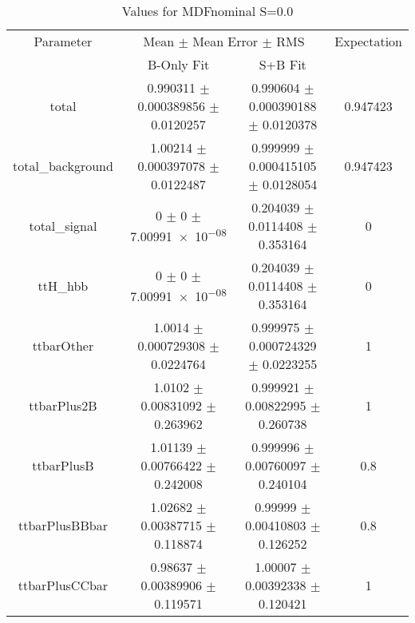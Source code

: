 \begin{table}
\centering
\caption{Values for MDFnominal S=0.0}
\begin{tabular}{cccc}
\toprule
Parameter & \multicolumn{2}{c}{Mean $\pm$ Mean Error $\pm$ RMS} & Expectation\\
 & B-Only Fit & S+B Fit & \\
\midrule
total & \num{0.990311} $\pm$ \num{0.000389856} $\pm$ \num{0.0120257} & \num{0.990604} $\pm$ \num{0.000390188} $\pm$ \num{0.0120378} & \num{0.947423}\\
total\_background & \num{1.00214} $\pm$ \num{0.000397078} $\pm$ \num{0.0122487} & \num{0.999999} $\pm$ \num{0.000415105} $\pm$ \num{0.0128054} & \num{0.947423}\\
total\_signal & \num{0} $\pm$ \num{0} $\pm$ \num{7.00991e-08} & \num{0.204039} $\pm$ \num{0.0114408} $\pm$ \num{0.353164} & \num{0}\\
ttH\_hbb & \num{0} $\pm$ \num{0} $\pm$ \num{7.00991e-08} & \num{0.204039} $\pm$ \num{0.0114408} $\pm$ \num{0.353164} & \num{0}\\
ttbarOther & \num{1.0014} $\pm$ \num{0.000729308} $\pm$ \num{0.0224764} & \num{0.999975} $\pm$ \num{0.000724329} $\pm$ \num{0.0223255} & \num{1}\\
ttbarPlus2B & \num{1.0102} $\pm$ \num{0.00831092} $\pm$ \num{0.263962} & \num{0.999921} $\pm$ \num{0.00822995} $\pm$ \num{0.260738} & \num{1}\\
ttbarPlusB & \num{1.01139} $\pm$ \num{0.00766422} $\pm$ \num{0.242008} & \num{0.999996} $\pm$ \num{0.00760097} $\pm$ \num{0.240104} & \num{0.8}\\
ttbarPlusBBbar & \num{1.02682} $\pm$ \num{0.00387715} $\pm$ \num{0.118874} & \num{0.99999} $\pm$ \num{0.00410803} $\pm$ \num{0.126252} & \num{0.8}\\
ttbarPlusCCbar & \num{0.98637} $\pm$ \num{0.00389906} $\pm$ \num{0.119571} & \num{1.00007} $\pm$ \num{0.00392338} $\pm$ \num{0.120421} & \num{1}\\
\bottomrule
\end{tabular}
\end{table}
